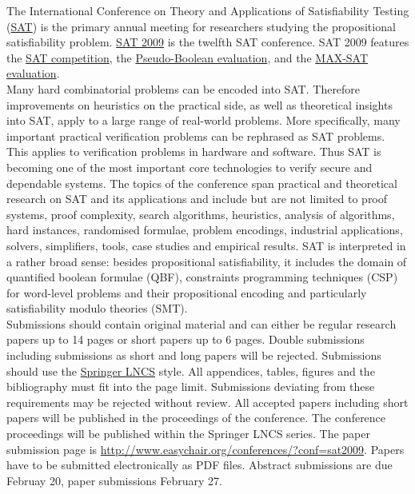 \documentclass[10pt]{article}
\begin{document}
\begin{minipage}[t]{9.25cm}
  \begin{minipage}[t]{9.25cm}
    \vspace*{0.15cm}
  {\small
  The International Conference on Theory and Applications of
  Satisfiability Testing (\href{http://www.satisfiability.org}{SAT})
  is the primary annual meeting for researchers studying the
  propositional satisfiability
  problem. \href{http://cs-svr1.swan.ac.uk/~csoliver/SAT2009}{SAT
    2009} is the twelfth SAT conference. SAT 2009 features the
  \href{http://www.satcompetition.org/2009}{SAT competition}, the
  \href{http://www.cril.univ-artois.fr/PB09}{Pseudo-Boolean evaluation}, and the
  \href{http://www.maxsat.udl.cat/09/}{MAX-SAT evaluation}. \\[0.1cm]
%
  Many hard combinatorial problems can be encoded into
  SAT. Therefore improvements on heuristics on the practical side, as
  well as theoretical insights into SAT, apply to a large range of
  real-world problems. More specifically, many important practical
  verification problems can be rephrased as SAT problems. This
  applies to verification problems in hardware and software. Thus SAT
  is becoming one of the most important core technologies to verify
  secure and dependable systems. The topics of the conference span
  practical and theoretical research on SAT and its applications and
  include but are not limited to proof systems, proof complexity,
  search algorithms, heuristics, analysis of algorithms, hard
  instances, randomised formulae, problem encodings, industrial
  applications, solvers, simplifiers, tools, case studies and
  empirical results. SAT is interpreted in a rather broad sense:
  besides propositional satisfiability, it includes the domain
  of quantified boolean formulae (QBF), constraints programming
  techniques (CSP) for word-level problems and their propositional
  encoding and particularly satisfiability modulo theories (SMT). \\[0.1cm]
%
  Submissions should contain original material and can either be
  regular research papers up to 14 pages or short papers up to 6
  pages. Double submissions including submissions as short and long
  papers will be rejected.  Submissions should use the 
  \href{http://www.springer.com/comp/lncs/Authors.html}{Springer LNCS}
  style. All appendices, tables, figures and the bibliography 
  must fit into the page limit. Submissions deviating from these
  requirements may be rejected without review. All accepted papers
  including short papers will be published in the proceedings of the
  conference. The conference proceedings will be published within
  the Springer LNCS series. The paper submission page is
  \url{http://www.easychair.org/conferences/?conf=sat2009}. Papers have to
  be submitted electronically as PDF files. Abstract submissions are due
  Februay 20, paper submissions February 27.
  }
  \end{minipage}


\end{minipage}
\end{document}
